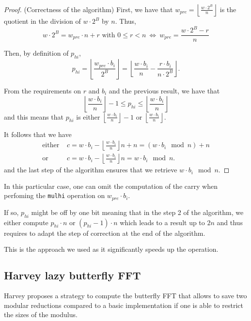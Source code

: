 \documentclass[a4paper]{article}
\begin{document}
\begin{proof} (Correctness of the algorithm)
First, we have that $w_{pre}= \left\lfloor\frac{w\cdot 2^B}{n}\right\rfloor $ is the quotient in the division 
of $w\cdot 2^B$ by $n$. Thus,
\[
    w\cdot 2^B = w_{pre}\cdot n + r \text{ with } 0 \leq r < n\ \Longleftrightarrow\ w_{pre} = \dfrac{w\cdot 2^B - r}{n}
\]

Then, by definition of $p_{hi}$,
\[
p_{hi} = \left\lfloor\frac{w_{pre}\cdot b_i}{2^B}\right\rfloor
= \left\lfloor\dfrac{w\cdot b_i}{n} - \dfrac{r\cdot b_i}{n\cdot 2^B} \right\rfloor.
\]

From the requirements on $r$ and $b_i$ and the previous result, we have that
\[
\left\lfloor\dfrac{w\cdot b_i}{n}\right\rfloor - 1 \leq p_{hi} \leq \left\lfloor\dfrac{w\cdot b_i}{n}\right\rfloor
\]
and this means that $p_{hi}$ is either $\left\lfloor\frac{w\cdot b_i}{n}\right\rfloor - 1$ or $\left\lfloor\frac{w\cdot b_i}{n}\right\rfloor$.


It follows that we have
\begin{align*}
\text{either } &c=w\cdot b_i - \left\lfloor\frac{w\cdot b_i}{n}\right\rfloor n + n = (w\cdot b_i \mod n)+n \\
\text{or } &c=w\cdot b_i - \left\lfloor\frac{w\cdot b_i}{n}\right\rfloor n = w\cdot b_i \mod n.
\end{align*}
and the last step of the algorithm ensures that we retrieve $w\cdot b_i \mod n$.
\end{proof}

\begin{remark}
    In this particular case, one can omit the computation of the carry when perfoming the \texttt{mulhi} operation on $w_{pre}\cdot b_i$.

    If so, $p_{hi}$ might be off by one bit meaning that in the step 2 of the algorithm, we either compute $p_{hi}\cdot n$
    or $(p_{hi}-1)\cdot n$ which leads to a result up to $2n$ and thus requires to adapt the step of correction at the end of the algorithm.

    This is the approach we used as it significantly speeds up the operation.
\end{remark}


\subsection{Harvey lazy butterfly FFT}

Harvey proposes a strategy\cite{DBLP:journals/corr/abs-1205-2926} to compute the butterfly FFT that allows to save two
modular reductions compared to a basic implementation if one is able to restrict the sizes of the modulus. 
\end{document}
